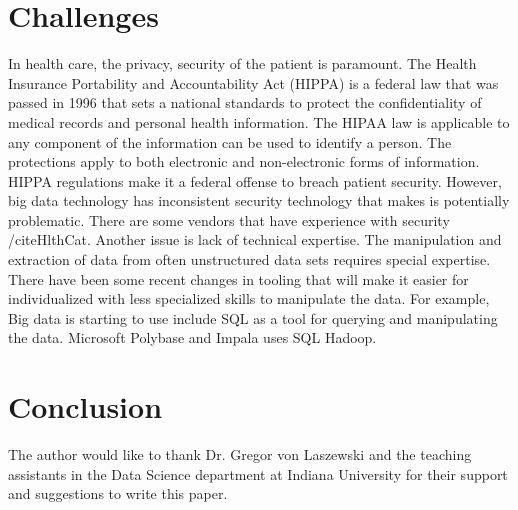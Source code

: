 \documentclass[sigconf]{acmart}
\begin{document}
\section{Challenges}
In health care, the privacy, security of the patient is paramount. The Health Insurance Portability and Accountability Act (HIPPA) is a federal law that was passed in 1996 that sets a national standards to protect the confidentiality of medical records and personal health information. The HIPAA law is applicable to any component of the information can be used to identify a person. The protections apply to both electronic and non-electronic forms of information. HIPPA regulations make it a federal offense to breach patient security.  However, big data technology has inconsistent security technology that makes is potentially problematic. There are some vendors that have experience with security /cite{HlthCat}. 
Another issue is lack of technical expertise. The manipulation and extraction of data from often unstructured data sets requires special expertise. There have been some recent changes in tooling that will make it easier for individualized with less specialized skills to manipulate the data. For example, Big data is starting to use include SQL as a tool for querying and manipulating the data. Microsoft Polybase and Impala uses SQL Hadoop. 
 

\section{Conclusion}








\begin{acks}

  The author would like to thank Dr. Gregor von Laszewski and the teaching assistants in the Data Science department at Indiana University for their support and suggestions to write this paper.

\end{acks}




 
\end{document}
